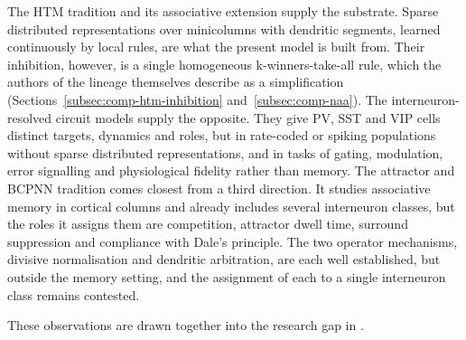 The HTM tradition and its associative extension supply the substrate. Sparse
distributed representations over minicolumns with dendritic segments, learned
continuously by local rules, are what the present model is built from. Their
inhibition, however, is a single homogeneous k-winners-take-all rule, which
the authors of the lineage themselves describe as a simplification
(Sections~\ref{subsec:comp-htm-inhibition} and~\ref{subsec:comp-naa}). The interneuron-resolved circuit models
supply the opposite. They give PV, SST and VIP cells distinct targets,
dynamics and roles, but in rate-coded or spiking populations without sparse
distributed representations, and in tasks of gating, modulation, error
signalling and physiological fidelity rather than memory. The attractor and
BCPNN tradition comes closest from a third direction. It studies associative
memory in cortical columns and already includes several interneuron classes,
but the roles it assigns them are competition, attractor dwell time, surround
suppression and compliance with Dale's principle. The two operator mechanisms,
divisive normalisation and dendritic arbitration, are each well established,
but outside the memory setting, and the assignment of each to a single
interneuron class remains contested.

These observations are drawn together into the research gap in \gapref{}.

